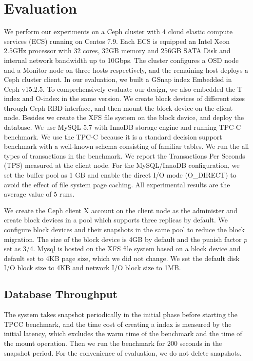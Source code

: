 \documentclass[sigconf, nonacm]{acmart}
\begin{document}
{\tiny {\normalsize }}
\section{Evaluation}
\label{Evaluation}
We perform our experiments on a Ceph cluster with 4 cloud elastic compute services (ECS) running on Centos 7.9. Each ECS is equipped an Intel Xeon 2.5GHz processor with 32 cores, 32GB memory and 256GB SATA Disk and internal network bandwidth up to 10Gbps. The cluster configures a OSD node and a Monitor node on three hosts respectively, and the remaining host deploys a Ceph cluster client.
In our evaluation, we built a GSnap index Embedded in Ceph v15.2.5. To comprehensively evaluate our design, we also embedded the T-index and O-index in the same version.
We create block devices of different sizes through Ceph RBD interface, and then mount the block device on the client node. Besides we create the XFS file system on the block device, and deploy the database.
We use MySQL 5.7 with InnoDB storage engine and running TPC-C benchmark. We use the TPC-C because it is a standard decision support benchmark with a well-known schema consisting of familiar tables. We run the all types of transactions in the benchmark. We report the Transactions Per Seconds (TPS) measured at the client node. For the MySQL/InnoDB configuration, we set the buffer pool as 1 GB and enable the direct I/O mode (O\_DIRECT) to avoid the effect of file system page caching.  All experimental results are the average value of 5 runs.

We create the Ceph client X account on the client node as the administer and create block devices in a pool which supports three replicas by default. We configure block devices and their snapshots in the same pool to reduce the block migration.
The size of the block device is 4GB by default and the punish factor $p$ set as 3/4.
Mysql is hosted on the XFS file system based on a block device and default set to 4KB page size, which we did not change. We set the default disk I/O block size to 4KB and network I/O block size to 1MB. 


\subsection{Database Throughput}
The system takes snapshot periodically in the initial phase before starting the TPCC \cite{Tpcc} benchmark, and the time cost of creating a index is measured by the initial latency, which excludes the warm time of the benchmark and the time of the mount operation. Then we run the benchmark for 200 seconds in the snapshot period. For the convenience of evaluation, we do not delete snapshots.
\end{document}

